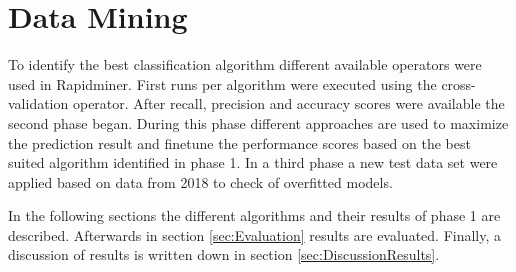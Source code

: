 \section{Data Mining}

To identify the best classification algorithm different available operators were used in Rapidminer.
First runs per algorithm were executed using the cross-validation operator. After recall, precision and accuracy scores were available the second phase began. During this phase different approaches are used to maximize the prediction result and finetune the performance scores based on the best suited algorithm identified in phase 1. In a third phase a new test data set were applied based on data from 2018 to check of overfitted models. \newline

In the following sections the different algorithms and their results of phase 1 are described. 
Afterwards in section \ref{sec:Evaluation} results are evaluated.
Finally, a discussion of results is written down in section \ref{sec:DiscussionResults}. 











